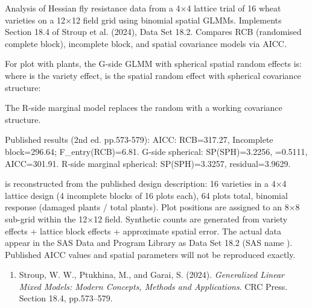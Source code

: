 \documentclass[a4paper]{book}
\begin{document}
%
\begin{Description}
Analysis of Hessian fly resistance data from a 4×4 lattice trial of 16
wheat varieties on a 12×12 field grid using binomial spatial GLMMs.
Implements Section 18.4 of Stroup et al. (2024), Data Set 18.2.
Compares RCB (randomised complete block), incomplete block, and
spatial covariance models via AICC.
\end{Description}
%
\begin{Details}
For plot  with  plants, the G-side GLMM with
spherical spatial random effects is:
where  is the variety effect,  is the spatial
random effect with spherical covariance structure:

The R-side marginal model replaces the random  with a working
covariance structure.

Published results (2nd ed. pp.573-579):
AICC: RCB=317.27, Incomplete block=296.64; F\_entry(RCB)=6.81.
G-side spherical: SP(SPH)=3.2256, =0.5111, AICC=301.91.
R-side marginal spherical: SP(SPH)=3.3257, residual=3.9629.
\end{Details}
%
\begin{Note}
  is reconstructed from the
published design description: 16 varieties in a 4×4 lattice design (4
incomplete blocks of 16 plots each), 64 plots total, binomial response
(damaged plants / total plants).  Plot positions are assigned to an
8×8 sub-grid within the 12×12 field.  Synthetic counts are generated
from variety effects + lattice block effects + approximate spatial error.
The actual data appear in the SAS Data and Program Library as Data Set 18.2
(SAS name ).  Published AICC values and spatial parameters
will not be reproduced exactly.
\end{Note}
%
\begin{References}
\begin{enumerate}

\item{} Stroup, W. W., Ptukhina, M., and Garai, S. (2024).
\emph{Generalized Linear Mixed Models: Modern Concepts, Methods and
Applications}. CRC Press. Section 18.4, pp.573–579.

\end{enumerate}

\end{References}
\end{document}

